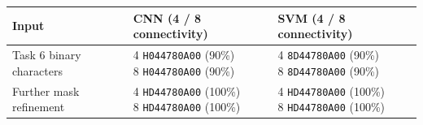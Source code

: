 \begin{center}\begin{tabular}{lll}\toprule
Input & CNN (4 / 8 connectivity) & SVM (4 / 8 connectivity) \\\midrule
Task 6 binary characters & \shortstack[l]{4 \texttt{H044780A00} (90\%) \\ 8 \texttt{H044780A00} (90\%)} & \shortstack[l]{4 \texttt{8D44780A00} (90\%) \\ 8 \texttt{8D44780A00} (90\%)} \\
Further mask refinement & \shortstack[l]{4 \texttt{HD44780A00} (100\%) \\ 8 \texttt{HD44780A00} (100\%)} & \shortstack[l]{4 \texttt{HD44780A00} (100\%) \\ 8 \texttt{HD44780A00} (100\%)} \\
\bottomrule\end{tabular}\end{center}
